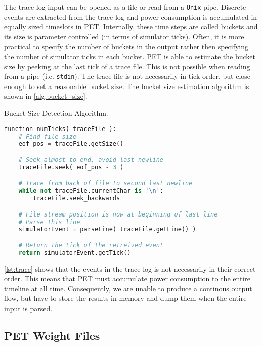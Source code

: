The trace log input can be opened as a file or read from a \texttt{Unix} pipe.
Discrete events are extracted from the trace log and power consumption is
accumulated in equally sized timeslots in PET. Internally, these time steps are
called buckets and its size is parameter controlled (in terms of simulator
ticks). Often, it is more practical to specify the number of buckets in the
output rather then specifying the number of simulator ticks in each bucket. PET
is able to estimate the bucket size by peeking at the last tick of a trace file.
This is not possible when reading from a pipe (i.e. \texttt{stdin}). The trace
file is not necessarily in tick order, but close enough to set a reasonable
bucket size. The bucket size estimation algorithm is shown in
\autoref{alg:bucket_size}.

\begin{algorithm}[htb]
    \caption{Bucket Size Detection Algorithm.}
    \label{alg:bucket_size}
    \begin{lstlisting}[language=Python,style=algo]
function numTicks( traceFile ):
    # Find file size
    eof_pos = traceFile.getSize()

    # Seek almost to end, avoid last newline
    traceFile.seek( eof_pos - 3 )

    # Trace from back of file to second last newline
    while not traceFile.currentChar is '\n':
        traceFile.seek_backwards

    # File stream position is now at beginning of last line
    # Parse this line
    simulatorEvent = parseLine( traceFile.getLine() )

    # Return the tick of the retreived event
    return simulatorEvent.getTick()
    \end{lstlisting}
\end{algorithm}

\autoref{lst:trace} shows that the events in the trace log is not necessarily in
their correct order. This means that PET must accumulate power consumption to the
entire timeline at all time. Consequently, we are unable to produce a continous
output flow, but have to store the results in memory and dump them when the
entire input is parsed. 

\subsection{PET Weight Files}

